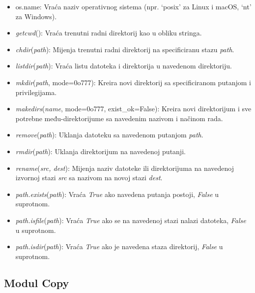 \begin{itemize}
	\item os.name: Vraća naziv operativnog sistema (npr. `posix' za Linux i macOS, `nt' za Windows).
	\item  \textit{getcwd}(): Vraća trenutni radni direktorij kao u obliku stringa.
	\item  \textit{chdir}(\emph{path}): Mijenja trenutni radni direktorij na specificiranu stazu \emph{path}.
	\item \textit{listdir}(\emph{path}): Vraća listu datoteka i direktorija u navedenom direktoriju.
	\item \textit{mkdir}(\emph{path}, mode=0o777): Kreira novi direktorij sa specificiranom putanjom i privilegijama.
	\item \textit{makedirs}(\textit{name}, mode=0o777, exist\_ok=False): Kreira novi direktorijum i sve potrebne među-direktorijume sa navedenim nazivom i načinom rada.
	\item \textit{remove}(\emph{path}): Uklanja datoteku sa navedenom putanjom \emph{path}.
	\item \textit{rmdir}(\emph{path}): Uklanja direktorijum na navedenoj putanji.
	\item \textit{rename}(\emph{src, dest}): Mijenja naziv datoteke ili direktorijuma na navedenoj izvornoj stazi \emph{src} sa nazivom na novoj stazi \emph{dest}.
	\item \textit{path.exists}(\emph{path}): Vraća \emph{True} ako navedena putanja postoji, \emph{False} u suprotnom.
	\item \textit{path.isfile}(\emph{path}): Vraća \emph{True} ako se na navedenoj stazi nalazi datoteka, \emph{False} u suprotnom.
	\item \textit{path.isdir}(\emph{path}): Vraća \emph{True} ako je navedena staza direktorij, \emph{False} u suprotnom.
  
\end{itemize}

\subsection{Modul Copy}


